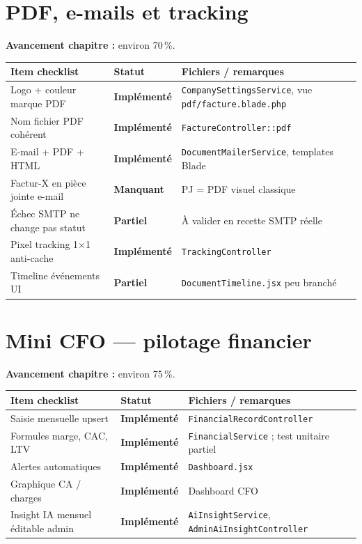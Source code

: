 \documentclass[11pt,a4paper]{report}
\newcommand{\route}[1]{\texttt{\small #1}}
\newcommand{\ctrl}[1]{\texttt{\small #1}}
\newcommand{\svc}[1]{\texttt{\small #1}}
\newcommand{\statimpl}{\textcolor{statok}{\textbf{Implémenté}}}
\newcommand{\statpart}{\textcolor{statpartial}{\textbf{Partiel}}}
\newcommand{\statmiss}{\textcolor{statno}{\textbf{Manquant}}}
\begin{document}
\chapter{PDF, e-mails et tracking}

\textbf{Avancement chapitre :} environ 70\,\%.

\begin{longtable}{@{}L{7.8cm}C{2.4cm}L{4.4cm}@{}}
    \toprule
    \textbf{Item checklist} & \textbf{Statut} & \textbf{Fichiers / remarques} \\
    \midrule
    \endhead
    Logo + couleur marque PDF & \statimpl & \svc{CompanySettingsService}, vue \route{pdf/facture.blade.php} \\
    Nom fichier PDF cohérent & \statimpl & \ctrl{FactureController::pdf} \\
    E-mail + PDF + HTML & \statimpl & \svc{DocumentMailerService}, templates Blade \\
    Factur-X en pièce jointe e-mail & \statmiss & PJ = PDF visuel classique \\
    Échec SMTP ne change pas statut & \statpart & À valider en recette SMTP réelle \\
    Pixel tracking 1$\times$1 anti-cache & \statimpl & \ctrl{TrackingController} \\
    Timeline événements UI & \statpart & \route{DocumentTimeline.jsx} peu branché \\
    \bottomrule
\end{longtable}

\chapter{Mini CFO — pilotage financier}

\textbf{Avancement chapitre :} environ 75\,\%.

\begin{longtable}{@{}L{7.8cm}C{2.4cm}L{4.4cm}@{}}
    \toprule
    \textbf{Item checklist} & \textbf{Statut} & \textbf{Fichiers / remarques} \\
    \midrule
    \endhead
    Saisie mensuelle upsert & \statimpl & \ctrl{FinancialRecordController} \\
    Formules marge, CAC, LTV & \statimpl & \svc{FinancialService} ; test unitaire partiel \\
    Alertes automatiques & \statimpl & \route{Dashboard.jsx} \\
    Graphique CA / charges & \statimpl & Dashboard CFO \\
    Insight IA mensuel éditable admin & \statimpl & \svc{AiInsightService}, \ctrl{AdminAiInsightController} \\
    \bottomrule
\end{longtable}
\end{document}
